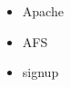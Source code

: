 \begin{slide}
  \begin{itemize}
      \item Apache
      \item AFS
      \item signup
  \end{itemize}
\end{slide}

